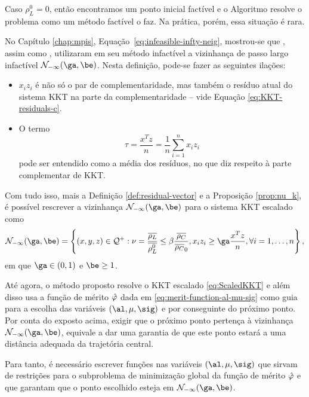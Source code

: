 Caso $\rho_L^0 = 0$, então encontramos um ponto inicial factível e o Algoritmo resolve o problema como um método factível o faz. Na prática, porém, essa situação é rara.


No Capítulo \ref{chap:mpis}, Equação~\eqref{eq:infeasible-infty-neig},
mostrou-se que \textcite{Kojima:1993fe}, assim como 
\textcite[pg.~110]{Wright:Primal-dual-interior-point:1997h}, utilizaram em seu
método infactível a vizinhança de passo largo infactível $\Nset_{-\infty}(\ga,\be)$. Nesta definição, pode-se fazer as seguintes ilações:
\begin{itemize}
  \item $x_iz_i$  é não só o par de complementaridade, mas também o resíduo
  atual do sistema KKT na parte da complementaridade -- vide  Equação
  \eqref{eq:KKT-residuals-c}.
  \item O termo  \[\tau = \frac{x^Tz}{n} = \frac{1}{n}\sum_{i=1}^nx_iz_i\]
  pode ser entendido como a média dos resíduos, no que diz respeito à parte
  complementar de KKT.
\end{itemize}

Com tudo isso, mais a Definição \ref{def:residual-vector} e a Proposição \ref{prop:nu_k}, é possível rescrever  a vizinhança
 $\Nset_{-\infty}(\ga,\be)$ para  o sistema KKT escalado
como
\begin{equation}
\Nset_{-\infty}(\ga,\be) =
 \left\{(x,y,z) \in \Qset^+: \nu = \frac{\dbvec{\rho_L}}{\dbvec{\rho^0_L}}    \leq
\beta\frac{\dbvec{\rho_C}}{\dbvec{\rho_C}_0}, x_iz_i \geq
{\ga}\frac{x^Tz}{n},\forall i =1,\ldots,n  \right\},
\end{equation}
em que $\ga\in(0,1)$ e $\be\geq1$. 


Até agora, o método proposto resolve o \ac{KKT} escalado \eqref{eq:ScaledKKT}
e além disso usa a função de mérito $\hat{\varphi}$ dada em
\eqref{eq:merit-function-al-mu-sig} como guia para a escolha das variáveis
$(\al,\mu,\sig)$  e por conseguinte do próximo ponto. Por conta do exposto
acima, exigir que o próximo ponto pertença à vizinhança $\Nset_{-\infty}(\ga,\be)$, equivale a dar 
uma garantia de que este ponto estará a uma  distância adequada da
trajetória central.

Para tanto, é necessário  escrever funções nas variáveis
$(\al,\mu,\sig)$ que sirvam de restrições para o subproblema de minimização global da
função de mérito $\hat{\varphi}$ e que garantam que o ponto escolhido esteja em 
$\Nset_{-\infty}(\ga,\be)$. 


